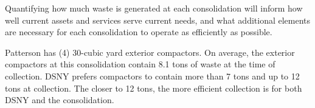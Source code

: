 
    Quantifying how much waste is generated at each consolidation will inform how well current assets and services serve current needs, and what additional elements are necessary for each consolidation to operate as efficiently as possible.
    
    Patterson has (4) 30-cubic yard exterior compactors. On average, the exterior compactors at this consolidation contain 8.1 tons of waste at the time of collection. DSNY prefers compactors to contain more than 7 tons and up to 12 tons at collection. The closer to 12 tons, the more efficient collection is for both DSNY and the consolidation.